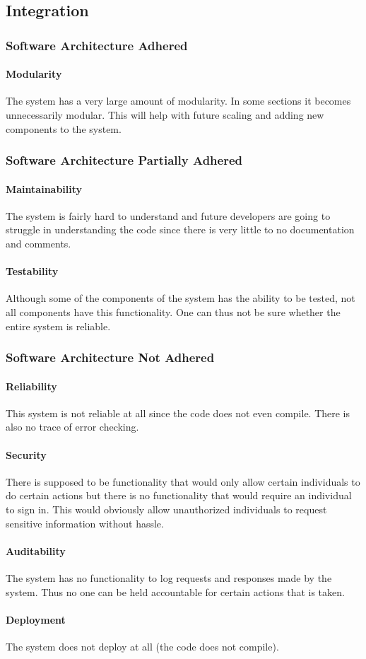 \documentclass{article}
\begin{document}
	\subsection{Integration}
		\subsubsection{Software Architecture Adhered}
			\paragraph{Modularity} The system has a very large amount of modularity. In some sections it becomes unnecessarily modular. This will help with future scaling and adding new components to the system.
			
		\subsubsection{Software Architecture Partially Adhered}
			\paragraph{Maintainability} The system is fairly hard to understand and future developers are going to struggle in understanding the code since there is very little to no documentation and comments.
			\paragraph{Testability} Although some of the components of the system has the ability to be tested, not all components have this functionality. One can thus not be sure whether the entire system is reliable.			
			
		\subsubsection{Software Architecture Not Adhered}
			\paragraph{Reliability} This system is not reliable at all since the code does not even compile. There is also no trace of error checking.
			\paragraph{Security} There is supposed to be functionality that would only allow certain individuals to do certain actions but there is no functionality that would require an individual to sign in. This would obviously allow unauthorized individuals to request sensitive information without hassle.
			\paragraph{Auditability} The system has no functionality to log requests and responses made by the system. Thus no one can be held accountable for certain actions that is taken.
			\paragraph{Deployment} The system does not deploy at all (the code does not compile).
\end{document}
